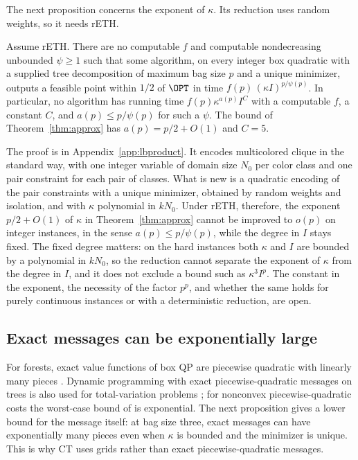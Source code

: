 The next proposition concerns the exponent of $\kappa$. Its reduction uses
random weights, so it needs rETH.

\begin{proposition}
\label{prop:lbproduct}
Assume rETH. There are no computable $f$ and computable nondecreasing
unbounded $\psi\ge1$ such that some algorithm, on every integer box quadratic
with a supplied tree decomposition of maximum bag size $p$ and a unique
minimizer, outputs a feasible point within $1/2$ of $\OPT$ in time
$f(p)\,(\kappa I)^{p/\psi(p)}$. In particular, no algorithm has running time
$f(p)\kappa^{a(p)}I^C$ with a computable $f$, a constant $C$, and
$a(p)\le p/\psi(p)$ for such a $\psi$. The bound of
Theorem~\ref{thm:approx} has $a(p)=p/2+O(1)$ and $C=5$.
\end{proposition}

The proof is in Appendix~\ref{app:lbproduct}. It encodes multicolored clique
in the standard way, with one integer variable of domain size $N_0$ per color
class and one pair constraint for each pair of classes. What is new is a
quadratic encoding of the pair constraints with a unique minimizer, obtained
by random weights and isolation, and with $\kappa$ polynomial in $kN_0$.
Under rETH, therefore, the exponent $p/2+O(1)$ of $\kappa$ in
Theorem~\ref{thm:approx} cannot be improved to $o(p)$ on integer instances,
in the sense $a(p)\le p/\psi(p)$, while the degree in $I$ stays fixed. The
fixed degree matters: on the hard instances both $\kappa$ and $I$ are bounded
by a polynomial in $kN_0$, so the reduction cannot separate the exponent of
$\kappa$ from the degree in $I$, and it does not exclude a bound such as
$\kappa^3I^p$. The constant in the
exponent, the necessity of the factor $p^p$, and whether the same holds for
purely continuous instances or with a deterministic reduction, are open.

\subsection{Exact messages can be exponentially large}
\label{sec:limits-messages}

For forests, exact value functions of box QP are piecewise quadratic with
linearly many pieces \cite{DelPiaKhajavirad2026}. Dynamic programming with
exact piecewise-quadratic messages on trees is also used for total-variation
problems \cite{KolmogorovPockRolinek2016,KuricAhmetspahicPock2024}; for
nonconvex piecewise-quadratic costs the worst-case bound of
\cite{KuricAhmetspahicPock2024} is exponential. The next proposition gives a
lower bound for the message itself: at bag size three, exact messages can have
exponentially many pieces even when $\kappa$ is bounded and the minimizer is
unique. This is why CT uses grids rather than exact piecewise-quadratic
messages.

